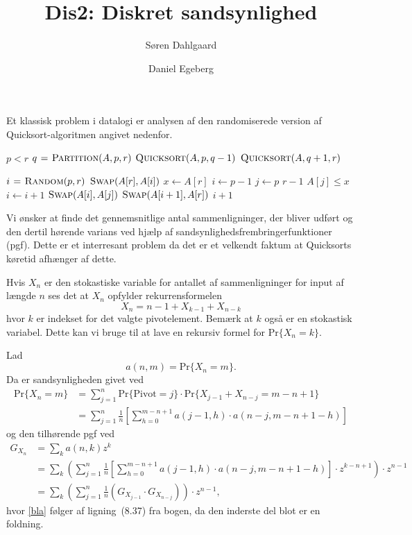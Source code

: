 \documentclass[a4paper]{article}
\title{Dis2: Diskret sandsynlighed}
\author{Søren Dahlgaard \and Daniel Egeberg}
\begin{document}
\maketitle

\noindent Et klassisk problem i datalogi er analysen af den
randomiserede version af Quicksort-algoritmen angivet nedenfor.

\begin{codebox}
    \li \If $p < r$
        \Then
    \li     $q \mathrel{\hspace{1pt}=\hspace{1pt}} \textnormal{\scshape Partition}(A,p,r)$
    \li     $\textnormal{\scshape Quicksort}(A,p,q-1)$
    \li     $\textnormal{\scshape Quicksort}(A,q+1,r)$
        \End
\end{codebox}
\begin{codebox}
    \li $i \mathrel{\hspace{1pt}=\hspace{1pt}} \textnormal{\scshape Random}(p,r)$
    \li $\textnormal{\scshape Swap}(A[r], A[i])$
    \li $x \gets A[r]$
    \li $i \gets p -1$
    \li \For $j \gets p$ \To $r-1$
        \Do
    \li     \If $A[j] \leq x$
            \Then
    \li         $i \gets i + 1$
    \li         $\textnormal{\scshape Swap}(A[i], A[j])$
            \End
        \End
    \li $\textnormal{\scshape Swap}(A[i+1], A[r])$
    \li \Return $i + 1$
\end{codebox}

Vi ønsker at finde det gennemsnitlige antal sammenligninger,
der bliver udført og den dertil hørende varians ved hjælp af
sandsynlighedsfrembringerfunktioner (pgf). Dette er et interresant
problem da det er et velkendt faktum at Quicksorts køretid
afhænger af dette.

Hvis $X_n$ er den stokastiske variable for antallet af sammenligninger for input af længde $n$ ses det at $X_n$ opfylder rekurrensformelen
\begin{equation}
    X_n = n-1 + X_{k-1} + X_{n-k}
\end{equation}
hvor $k$ er indekset for det valgte pivotelement. Bemærk at $k$ også er en stokastisk variabel. Dette kan vi bruge til at lave en rekursiv formel for $\text{Pr}\{X_n = k\}$.

Lad \[a(n,m) = \text{Pr}\{X_n=m\}.\] Da er sandsynligheden givet ved
\begin{align}
    \text{Pr}\{X_n = m\} &= \sum_{j=1}^n \text{Pr}\{\text{Pivot}=j\} \cdot \text{Pr}\{X_{j-1} + X_{n-j} = m-n+1 \} \\
                         &= \sum_{j=1}^n \frac{1}{n} \left[ \sum_{h=0}^{m-n+1} a(j-1,h) \cdot a(n-j,m-n+1-h) \right]
\end{align}
og den tilhørende pgf ved
\begin{align}
    G_{X_n} &= \sum_k a(n,k)z^k \\
               &= \sum_k \left( \sum_{j=1}^n \frac{1}{n} \left[ \sum_{h=0}^{m-n+1} a(j-1,h) \cdot a(n-j,m-n+1-h) \right] \cdot z^{k-n+1} \right) \cdot z^{n-1} \\
 \label{bla}   &= \sum_k \left( \sum_{j=1}^n \frac{1}{n} \left( G_{X_{j-1}} \cdot G_{X_{n-j}} \right) \right) \cdot z^{n-1},
\end{align}
hvor \eqref{bla} følger af ligning~(8.37) fra bogen, da den inderste del blot er en foldning.
\end{document}
